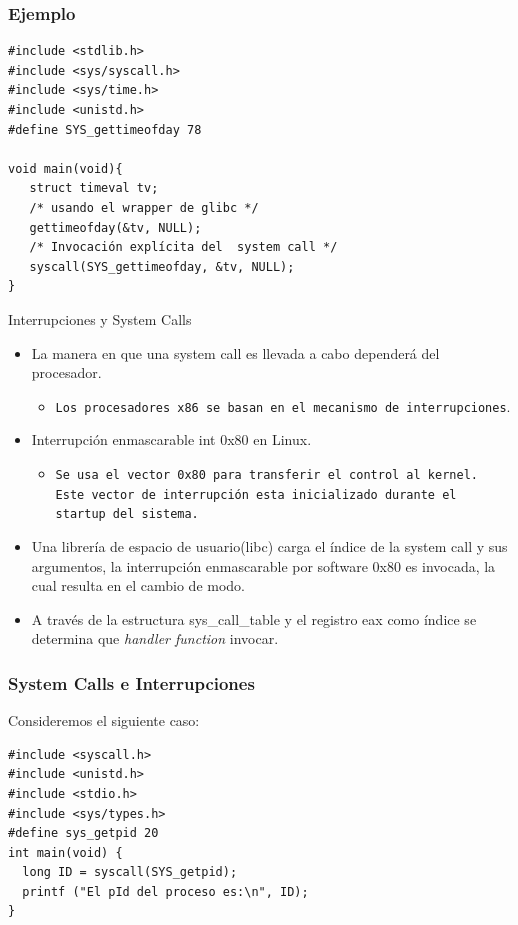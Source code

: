 \begin{frame}[fragile]
\frametitle{Ejemplo}
\begin{lstlisting}
#include <stdlib.h>
#include <sys/syscall.h>
#include <sys/time.h>
#include <unistd.h>
#define SYS_gettimeofday 78

void main(void){
   struct timeval tv;
   /* usando el wrapper de glibc */
   gettimeofday(&tv, NULL);
   /* Invocación explícita del  system call */
   syscall(SYS_gettimeofday, &tv, NULL);
}
\end{lstlisting}
\end{frame}


\begin{frame}{Interrupciones y System Calls}
  \begin{itemize}
    \item La manera en que una system call es llevada a cabo dependerá del procesador.
      \begin{itemize}
	    \item \texttt{Los procesadores x86 se basan en el mecanismo de interrupciones}.
	\end{itemize}  
    
   \item Interrupción enmascarable int 0x80 en Linux.
   \begin{itemize}  
   \item \texttt{Se usa el vector 0x80 para transferir el control al kernel. Este vector de interrupción esta inicializado durante el startup del sistema.}
 \end{itemize}
    \item Una librería de espacio de usuario(libc) carga el índice de la system call y sus argumentos, la interrupción enmascarable por software 	0x80 es invocada, la cual resulta en el cambio de modo.	
   \item A través de la estructura sys\_call\_table y el registro eax como índice se determina que \emph{handler function} invocar.
  \end{itemize}
\end{frame}

\begin{frame}[fragile]
\frametitle{System Calls e Interrupciones}
Consideremos el siguiente caso:
\begin{lstlisting}
#include <syscall.h>
#include <unistd.h>
#include <stdio.h>
#include <sys/types.h>
#define sys_getpid 20
int main(void) {
  long ID = syscall(SYS_getpid);
  printf ("El pId del proceso es:\n", ID);
}
\end{lstlisting}
\end{frame}

